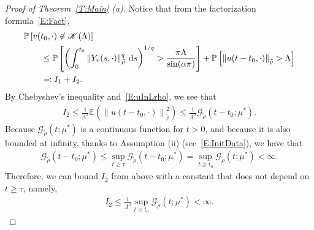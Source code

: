 \documentclass[sn-mathphys]{sn-jnl}%
\newcommand{\Norm}[1]{\left\| #1 \right\|}
\newcommand{\ud}{\ensuremath{\mathrm{d}}}
\numberwithin{equation}{section}
\theoremstyle{thmstyleone}%
\theoremstyle{thmstyletwo}%
\theoremstyle{thmstylethree}%
\begin{document}
\begin{proof}[Proof of Theorem~\ref{T:Main} (a)]
  Notice that from the factorization formula~\eqref{E:Fact},
  \begin{align*}
    \MoveEqLeft
    \mathbb{P} \left[ v(t_0,\cdot) \not \in \mathscr{K}(\Lambda) \right ]\\
    & \le \mathbb{P}\left[ \left(\int_{0}^{t_0} \Norm{Y_v(s,\cdot)}_{\tilde{\rho}}^q \: \ud s\right)^{1/q} > \dfrac{\pi \Lambda}{\sin(\alpha \pi )} \right]
    + \mathbb{P}\left[ \Norm{u(t-t_0,\cdot)}_{\tilde{\rho}} > \Lambda \right] \\
    & \eqqcolon I_1+I_2.
  \end{align*}
  By Chebyshev's inequality and~\eqref{E:uInLrho}, we see that
  \begin{align*}
    I_2\le\frac{1}{\Lambda^2} \mathbb{E}\left(\Norm{u(t-t_0,\cdot)}_{\tilde{\rho}}^2\right)
    \le \frac{1}{\Lambda^2} \mathcal{G}_{\tilde{\rho}}\left(t-t_0;\mu^*\right).
  \end{align*}
  Because $\mathcal{G}_{\tilde{\rho}}(t;\mu^*)$ is a continuous function for $t>0$, and because it
  is also bounded at infinity, thanks to Assumption (ii) (see~\eqref{E:InitData}), we have that
  \begin{align}\label{E:GtBdd}
    \mathcal{G}_{\tilde{\rho}}\left(t-t_0;\mu^*\right)
    \le \sup_{t\ge \tau} \mathcal{G}_{\tilde{\rho}}\left(t-t_0;\mu^*\right)
    = \sup_{t\ge t_0} \mathcal{G}_{\tilde{\rho}}\left(t;\mu^*\right)<\infty.
  \end{align}
  Therefore, we can bound $I_2$ from above with a constant that does not depend on $t\ge \tau$,
  namely,
  \begin{align*}
    I_2 \le\frac{1}{\Lambda^2} \sup_{t\ge t_0} \mathcal{G}_{\tilde{\rho}}\left(t;\mu^*\right)<\infty.
  \end{align*}


\end{proof}
\end{document}
